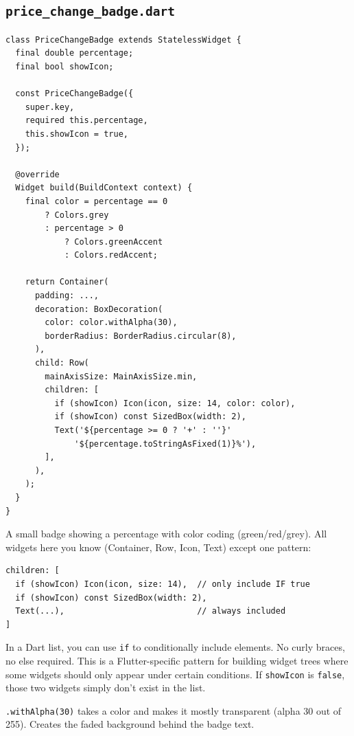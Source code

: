\documentclass[11pt, a4paper]{article}
\begin{document}
\subsection{\texttt{price\_change\_badge.dart}}

\begin{lstlisting}
class PriceChangeBadge extends StatelessWidget {
  final double percentage;
  final bool showIcon;

  const PriceChangeBadge({
    super.key,
    required this.percentage,
    this.showIcon = true,
  });

  @override
  Widget build(BuildContext context) {
    final color = percentage == 0
        ? Colors.grey
        : percentage > 0
            ? Colors.greenAccent
            : Colors.redAccent;

    return Container(
      padding: ...,
      decoration: BoxDecoration(
        color: color.withAlpha(30),
        borderRadius: BorderRadius.circular(8),
      ),
      child: Row(
        mainAxisSize: MainAxisSize.min,
        children: [
          if (showIcon) Icon(icon, size: 14, color: color),
          if (showIcon) const SizedBox(width: 2),
          Text('${percentage >= 0 ? '+' : ''}'
              '${percentage.toStringAsFixed(1)}%'),
        ],
      ),
    );
  }
}
\end{lstlisting}

A small badge showing a percentage with color coding (green/red/grey). All widgets here you know (Container, Row, Icon, Text) except one pattern:

\begin{conceptbox}[title=\textbf{Collection \texttt{if} --- Conditional Widgets in Lists}]
\begin{lstlisting}[numbers=none]
children: [
  if (showIcon) Icon(icon, size: 14),  // only include IF true
  if (showIcon) const SizedBox(width: 2),
  Text(...),                           // always included
]
\end{lstlisting}

In a Dart list, you can use \texttt{if} to conditionally include elements. No curly braces, no else required. This is a Flutter-specific pattern for building widget trees where some widgets should only appear under certain conditions. If \texttt{showIcon} is \texttt{false}, those two widgets simply don't exist in the list.
\end{conceptbox}

\texttt{.withAlpha(30)} takes a color and makes it mostly transparent (alpha 30 out of 255). Creates the faded background behind the badge text.
\end{document}
